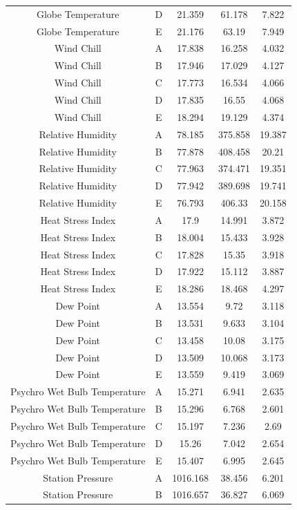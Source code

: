 \documentclass[a4paper]{article}
\numberwithin{figure}{section}
\numberwithin{table}{section}
\begin{document}
\begin{longtable}{ccccc}
Globe Temperature & D & 21.359 & 61.178 & 7.822 \\
Globe Temperature & E & 21.176 & 63.19 & 7.949 \\
Wind Chill & A & 17.838 & 16.258 & 4.032 \\
Wind Chill & B & 17.946 & 17.029 & 4.127 \\
Wind Chill & C & 17.773 & 16.534 & 4.066 \\
Wind Chill & D & 17.835 & 16.55 & 4.068 \\
Wind Chill & E & 18.294 & 19.129 & 4.374 \\
Relative Humidity & A & 78.185 & 375.858 & 19.387 \\
Relative Humidity & B & 77.878 & 408.458 & 20.21 \\
Relative Humidity & C & 77.963 & 374.471 & 19.351 \\
Relative Humidity & D & 77.942 & 389.698 & 19.741 \\
Relative Humidity & E & 76.793 & 406.33 & 20.158 \\
Heat Stress Index & A & 17.9 & 14.991 & 3.872 \\
Heat Stress Index & B & 18.004 & 15.433 & 3.928 \\
Heat Stress Index & C & 17.828 & 15.35 & 3.918 \\
Heat Stress Index & D & 17.922 & 15.112 & 3.887 \\
Heat Stress Index & E & 18.286 & 18.468 & 4.297 \\
Dew Point & A & 13.554 & 9.72 & 3.118 \\
Dew Point & B & 13.531 & 9.633 & 3.104 \\
Dew Point & C & 13.458 & 10.08 & 3.175 \\
Dew Point & D & 13.509 & 10.068 & 3.173 \\
Dew Point & E & 13.559 & 9.419 & 3.069 \\
Psychro Wet Bulb Temperature & A & 15.271 & 6.941 & 2.635 \\
Psychro Wet Bulb Temperature & B & 15.296 & 6.768 & 2.601 \\
Psychro Wet Bulb Temperature & C & 15.197 & 7.236 & 2.69 \\
Psychro Wet Bulb Temperature & D & 15.26 & 7.042 & 2.654 \\
Psychro Wet Bulb Temperature & E & 15.407 & 6.995 & 2.645 \\
Station Pressure & A & 1016.168 & 38.456 & 6.201 \\
Station Pressure & B & 1016.657 & 36.827 & 6.069 \\

\end{longtable}
\end{document}
